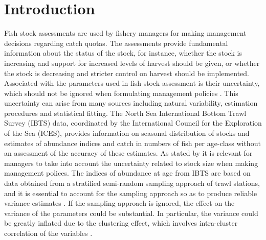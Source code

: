 \documentclass[a4paper 12pt]{article}
\numberwithin{equation}{section}
\begin{document}
\section{Introduction}
Fish stock assessments are used by fishery managers for making management decisions regarding catch quotas. The assessments provide fundamental information about the status of the stock, for instance, whether the stock is increasing and support for increased levels of harvest should be given, or whether the stock is decreasing and stricter control on harvest should be implemented. Associated with the parameters used in fish stock assessment is their uncertainty, which should not be ignored when formulating management policies \citep{ludwig1981measurement, berg2014evaluation}. This uncertainty can arise from many sources including natural variability, estimation procedures and statistical fitting. The North Sea International Bottom Trawl Survey (IBTS) data, coordinated by the International Council for the Exploration of the Sea (ICES), provides information on seasonal distribution of stocks and estimates of abundance indices and catch in numbers of fish per age-class without an assessment of the accuracy of these estimates. As stated by \citet{ludwig1981measurement} it is relevant for managers to take into account the uncertainty related to stock size when making management polices. The indices of abundance at age from IBTS  are based on data obtained from a stratified semi-random sampling approach of trawl stations,  and  it is essential to account for the sampling approach so as to produce reliable variance estimates \citep{lehtonen2004practical}. If the sampling approach is ignored, the effect on the variance  of the parameters could be substantial.  In particular, the variance could be greatly inflated  due to the clustering effect, which involves intra-cluster correlation of the variables \citep{aanes2015efficient, lehtonen2004practical}. 
\end{document}
